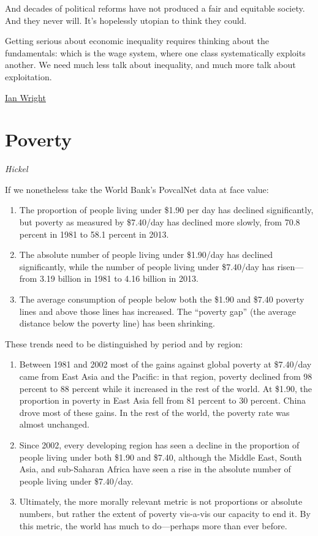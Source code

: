 \documentclass[
]{book}
\begin{document}
And decades of political reforms have not produced a fair and equitable society. And they never will. It's hopelessly utopian to think they could.

Getting serious about economic inequality requires thinking about the fundamentals: which is the wage system, where one class systematically exploits another. We need much less talk about inequality, and much more talk about exploitation.

\href{https://ianwrightsite.wordpress.com/2017/11/16/the-social-architecture-of-capitalism/}{Ian Wright}

\hypertarget{poverty}{%
\section{Poverty}\label{poverty}}

\emph{Hickel}

If we nonetheless take the World Bank's PovcalNet data at face value:

\begin{enumerate}
\def\labelenumi{\arabic{enumi}.}
\setcounter{enumi}{4}
\item
  The proportion of people living under \$1.90 per day has declined significantly, but poverty as measured by \$7.40/day has declined more slowly, from 70.8 percent in 1981 to 58.1 percent in 2013.
\item
  The absolute number of people living under \$1.90/day has declined significantly, while the number of people living under \$7.40/day has risen---from 3.19 billion in 1981 to 4.16 billion in 2013.
\item
  The average consumption of people below both the \$1.90 and \$7.40 poverty lines and above those lines has increased. The ``poverty gap'' (the average distance below the poverty line) has been shrinking.
\end{enumerate}

These trends need to be distinguished by period and by region:

\begin{enumerate}
\def\labelenumi{\arabic{enumi}.}
\setcounter{enumi}{7}
\item
  Between 1981 and 2002 most of the gains against global poverty at \$7.40/day came from East Asia and the Pacific: in that region, poverty declined from 98 percent to 88 percent while it increased in the rest of the world. At \$1.90, the proportion in poverty in East Asia fell from 81 percent to 30 percent. China drove most of these gains. In the rest of the world, the poverty rate was almost unchanged.
\item
  Since 2002, every developing region has seen a decline in the proportion of people living under both \$1.90 and \$7.40, although the Middle East, South Asia, and sub-Saharan Africa have seen a rise in the absolute number of people living under \$7.40/day.
\item
  Ultimately, the more morally relevant metric is not proportions or absolute numbers, but rather the extent of poverty vis-a-vis our capacity to end it. By this metric, the world has much to do---perhaps more than ever before.
\end{enumerate}
\end{document}

